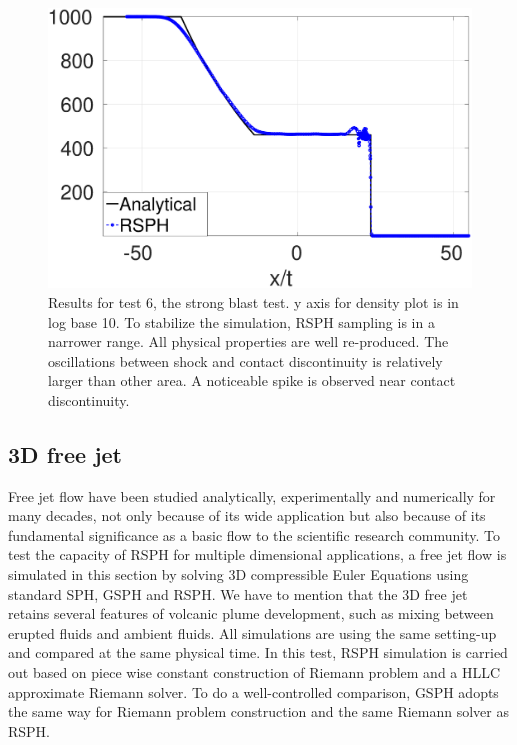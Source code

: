\begin{figure}
\begin{minipage}{.415 \textwidth}
    \end{minipage}%
    \begin{minipage}{.415 \textwidth}
        \centering
        \includegraphics[width=0.99 \textwidth]{./Chapter-4/Figures/strong-blast/StrBlst-RCM-p-Rp3}
    \end{minipage}%
    \caption{Results for test 6, the strong blast test. y axis for density plot is in log base 10.  To stabilize the simulation, RSPH sampling is in a narrower range. All physical properties are well re-produced. The oscillations between shock and contact discontinuity is relatively larger than other area. A noticeable spike is observed near contact discontinuity.}
    \label{fig:RCM-strong-blast}
\end{figure}

\subsection{3D free jet} \label{jet}
Free jet flow have been studied analytically, experimentally and numerically for many decades, not only because of its wide application but also because of its fundamental significance as a basic flow to the scientific research community. To test the capacity of RSPH for multiple dimensional applications, a free jet flow is simulated in this section by solving 3D compressible Euler Equations using standard SPH, GSPH and RSPH. We have to mention that the 3D free jet retains several features of volcanic plume development, such as mixing between erupted fluids and ambient fluids.
All simulations are using the same setting-up and compared at the same physical time. In this test, RSPH simulation is carried out based on piece wise constant construction of Riemann problem and a HLLC approximate Riemann solver. To do a well-controlled comparison, GSPH adopts the same way for Riemann problem construction and the same Riemann solver as RSPH. 

